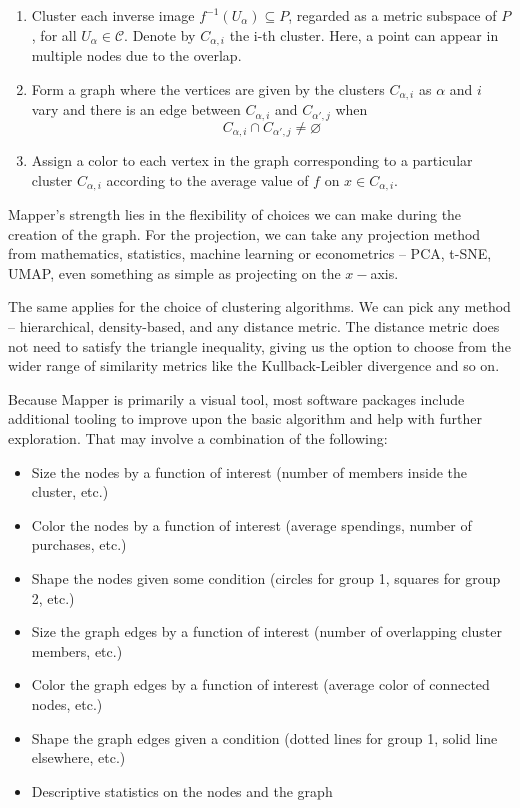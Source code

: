 \begin{enumerate}
  \item Cluster each inverse image $f^{-1}(U_{\alpha}) \subseteq P$, regarded as a metric subspace of $P$, for all $U_{\alpha} \in \mathcal{C}$. Denote by $C_{\alpha, i}$ the i-th cluster. Here, a point can appear in multiple nodes due to the overlap.

  \item Form a graph where the vertices are given by the clusters $C_{\alpha, i}$ as $\alpha$ and $i$ vary and there is an edge between $C_{\alpha, i}$ and $C_{\alpha', j}$ when
        \begin{equation*}
          C_{\alpha, i} \cap C_{\alpha', j} \neq \varnothing
        \end{equation*}

  \item Assign a color to each vertex in the graph corresponding to a particular cluster $C_{\alpha, i}$ according to the average value of $f$ on $x \in C_{\alpha, i}$.
\end{enumerate}

Mapper's strength lies in the flexibility of choices we can make during the creation of the graph. For the projection, we can take any projection method from mathematics, statistics, machine learning or  econometrics -- PCA, t-SNE, UMAP, even something as simple as projecting on the $x-$axis.

The same applies for the choice of clustering algorithms. We can pick any method -- hierarchical, density-based, and any distance metric. The distance metric does not need to satisfy the triangle inequality, giving us the option to choose from the wider range of similarity metrics like the Kullback-Leibler divergence and so on.

Because Mapper is primarily a visual tool, most software packages include additional tooling to improve upon the basic algorithm and help with further exploration. That may involve a combination of the following:

\begin{itemize}
  \item Size the nodes by a function of interest (number of members inside the cluster, etc.)
  \item Color the nodes by a function of interest (average spendings, number of purchases, etc.)
  \item Shape the nodes given some condition (circles for group 1, squares for group 2, etc.)
  \item Size the graph edges by a function of interest (number of overlapping cluster members, etc.)
  \item Color the graph edges by a function of interest (average color of connected nodes, etc.)
  \item Shape the graph edges given a condition (dotted lines for group 1, solid line elsewhere, etc.)
  \item Descriptive statistics on the nodes and the graph
\end{itemize}

